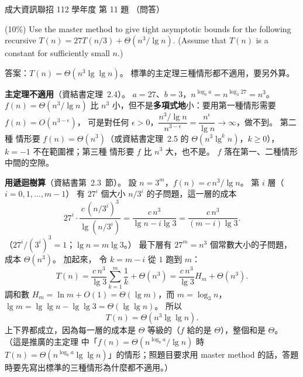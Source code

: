 \begin{pastexam}[label={px:ncku-112-prog-11}]{成大資訊聯招 112 學年度 第 11 題}
（問答）

(10\%) Use the master method to give tight asymptotic bounds for the following recursive
$T(n)=27T(n/3)+\Theta(n^3/\lg n)$. (Assume that $T(n)$ is a constant for sufficiently small $n$.)
\end{pastexam}

\begin{pastsoln}
答案：$T(n) = \Theta(n^3 \lg\lg n)$。 標準的主定理三種情形都不適用，要另外算。

\textbf{主定理不適用}（資結書定理~2.4）。 $a = 27$、$b = 3$，$n^{\log_b a} = n^{\log_3 27} = n^3$。
$f(n) = \Theta(n^3/\lg n)$ 比 $n^3$ 小，但不是\textbf{多項式地}小：要用第一種情形需要 $f(n) = O(n^{3 - \epsilon})$，
可是對任何 $\epsilon > 0$，$\dfrac{n^3/\lg n}{n^{3-\epsilon}} = \dfrac{n^\epsilon}{\lg n} \to \infty$，做不到。 第二種
情形要 $f(n) = \Theta(n^3)$（或資結書定理~2.5 的 $\Theta(n^3 \lg^k n)$，$k \ge 0$），$k = -1$ 不在範圍裡；第三種
情形要 $f$ 比 $n^3$ 大，也不是。 $f$ 落在第一、二種情形中間的空隙。

\textbf{用遞迴樹算}（資結書第~2.3~節）。 設 $n = 3^m$，$f(n) = c\,n^3/\lg n$。 第 $i$ 層（$i = 0, 1, \ldots, m - 1$）
有 $27^i$ 個大小 $n/3^i$ 的子問題，這一層的成本
\[
27^i \cdot \frac{c\,(n/3^i)^3}{\lg(n/3^i)} = \frac{c\,n^3}{\lg n - i \lg 3} = \frac{c\,n^3}{(m - i)\lg 3}.
\]
（$27^i/(3^i)^3 = 1$；$\lg n = m \lg 3$。） 最下層有 $27^m = n^3$ 個常數大小的子問題，成本 $\Theta(n^3)$。 加起來，
令 $k = m - i$ 從 $1$ 跑到 $m$：
\[
T(n) = \frac{c\,n^3}{\lg 3}\sum_{k=1}^{m}\frac{1}{k} + \Theta(n^3) = \frac{c\,n^3}{\lg 3} H_m + \Theta(n^3).
\]
調和數 $H_m = \ln m + O(1) = \Theta(\lg m)$，而 $m = \log_3 n$，$\lg m = \lg\lg n - \lg\lg 3 = \Theta(\lg\lg n)$。 所以
\[
T(n) = \Theta(n^3 \lg\lg n).
\]
上下界都成立，因為每一層的成本是 $\Theta$ 等級的（$f$ 給的是 $\Theta$），整個和是 $\Theta$。 （這是推廣的主定理
中「$f(n) = \Theta(n^{\log_b a}/\lg n)$ 時 $T(n) = \Theta(n^{\log_b a}\lg\lg n)$」的情形；照題目要求用 master method
的話，答題時要先寫出標準的三種情形為什麼都不適用。）
\end{pastsoln}
